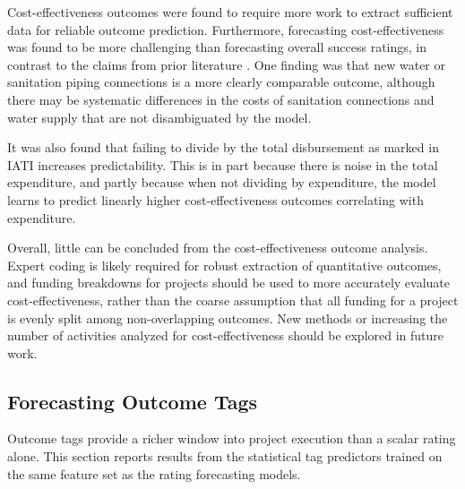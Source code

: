 \documentclass[12pt,a4paper]{article}
\let\citep\parencite
\begin{document}
Cost-effectiveness outcomes were found to require more work to extract sufficient data for reliable outcome prediction. Furthermore, forecasting cost-effectiveness was found to be more challenging than forecasting overall success ratings, in contrast to the claims from prior literature \citep{goldembergMindingGapAid2025}. One finding was that new water or sanitation piping connections is a more clearly comparable outcome, although there may be systematic differences in the costs of sanitation connections and water supply that are not disambiguated by the model.

It was also found that failing to divide by the total disbursement as marked in IATI increases predictability. This is in part because there is noise in the total expenditure, and partly because when not dividing by expenditure, the model learns to predict linearly higher cost-effectiveness outcomes correlating with expenditure. 

Overall, little can be concluded from the cost-effectiveness outcome analysis. Expert coding is likely required for robust extraction of quantitative outcomes, and funding breakdowns for projects should be used to more accurately evaluate cost-effectiveness, rather than the coarse assumption that all funding for a project is evenly split among non-overlapping outcomes. New methods or increasing the number of activities analyzed for cost-effectiveness should be explored in future work.

\FloatBarrier

\subsection{Forecasting Outcome Tags}
\label{sec:outcome_tags_results}

Outcome tags provide a richer window into project execution than a scalar rating alone. This section reports results from the statistical tag predictors trained on the same feature set as the rating forecasting models.
\end{document}
